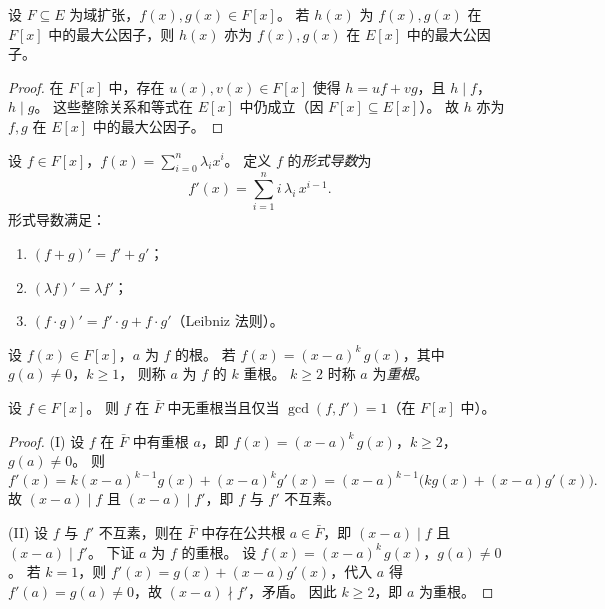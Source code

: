 \documentclass[lang=cn,a4paper,newtx]{elegantbook}
\begin{document}
\begin{proposition}
  设 $F\subseteq E$ 为域扩张，$f(x),g(x)\in F[x]$。
  若 $h(x)$ 为 $f(x),g(x)$ 在 $F[x]$ 中的最大公因子，则 $h(x)$ 亦为 $f(x),g(x)$ 在 $E[x]$ 中的最大公因子。
\end{proposition}

\begin{proof}
  在 $F[x]$ 中，存在 $u(x),v(x)\in F[x]$ 使得 $h=uf+vg$，且 $h\mid f$，$h\mid g$。
  这些整除关系和等式在 $E[x]$ 中仍成立（因 $F[x]\subseteq E[x]$）。
  故 $h$ 亦为 $f,g$ 在 $E[x]$ 中的最大公因子。
\end{proof}

\begin{definition}[形式导数]
  设 $f\in F[x]$，$f(x)=\sum_{i=0}^{n}\lambda_i x^i$。
  定义 $f$ 的\emph{形式导数}为
  \[
    f'(x)=\sum_{i=1}^{n}i\,\lambda_i\,x^{i-1}.
  \]
  形式导数满足：
  \begin{enumerate}
    \item $(f+g)'=f'+g'$；
    \item $(\lambda f)'=\lambda f'$；
    \item $(f\cdot g)'=f'\cdot g+f\cdot g'$（Leibniz 法则）。
  \end{enumerate}
\end{definition}

\begin{definition}[重根]
  设 $f(x)\in F[x]$，$a$ 为 $f$ 的根。
  若 $f(x)=(x-a)^k\,g(x)$，其中 $g(a)\ne 0$，$k\ge 1$，
  则称 $a$ 为 $f$ 的 $k$ 重根。
  $k\ge 2$ 时称 $a$ 为\emph{重根}。
\end{definition}

\begin{theorem}
  设 $f\in F[x]$。
  则 $f$ 在 $\bar F$ 中无重根当且仅当 $\gcd(f,f')=1$（在 $F[x]$ 中）。
\end{theorem}

\begin{proof}
  (I) 设 $f$ 在 $\bar F$ 中有重根 $a$，即 $f(x)=(x-a)^k\,g(x)$，$k\ge 2$，$g(a)\ne 0$。
  则
  \[
    f'(x)=k(x-a)^{k-1}g(x)+(x-a)^k g'(x)=(x-a)^{k-1}\bigl(kg(x)+(x-a)g'(x)\bigr).
  \]
  故 $(x-a)\mid f$ 且 $(x-a)\mid f'$，即 $f$ 与 $f'$ 不互素。

  (II) 设 $f$ 与 $f'$ 不互素，则在 $\bar F$ 中存在公共根 $a\in\bar F$，即 $(x-a)\mid f$ 且 $(x-a)\mid f'$。
  下证 $a$ 为 $f$ 的重根。
  设 $f(x)=(x-a)^k\,g(x)$，$g(a)\ne 0$。
  若 $k=1$，则 $f'(x)=g(x)+(x-a)g'(x)$，代入 $a$ 得 $f'(a)=g(a)\ne 0$，故 $(x-a)\nmid f'$，矛盾。
  因此 $k\ge 2$，即 $a$ 为重根。
\end{proof}
\end{document}
